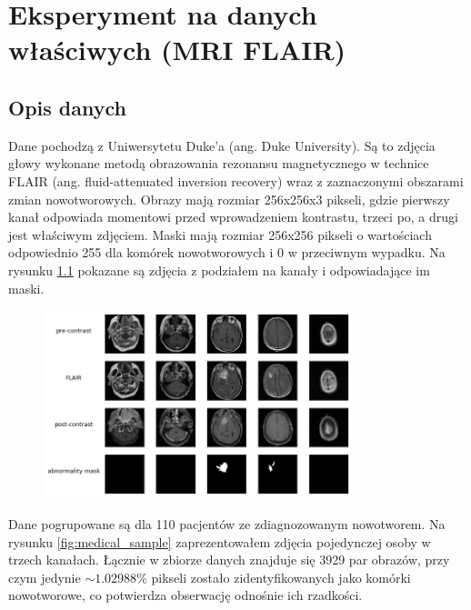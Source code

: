 \chapter{Eksperyment na danych właściwych (MRI FLAIR)}

\section{Opis danych}

Dane pochodzą z Uniwersytetu Duke'a (ang. Duke University). Są to zdjęcia głowy wykonane metodą obrazowania rezonansu magnetycznego w technice FLAIR (ang. fluid-attenuated inversion recovery) wraz z zaznaczonymi obszarami zmian nowotworowych. Obrazy mają rozmiar 256x256x3 pikseli, gdzie pierwszy kanał odpowiada momentowi przed wprowadzeniem kontrastu, trzeci po, a drugi jest właściwym zdjęciem. Maski mają rozmiar 256x256 pikseli o wartościach odpowiednio 255 dla komórek nowotworowych i 0 w przeciwnym wypadku. Na rysunku \ref{fig:medical_description} pokazane są zdjęcia z podziałem na kanały i odpowiadające im maski.

\begin{figure}[h!]
    \centering
    \includegraphics[width=0.8\textwidth]{images/medical_description}
    \caption{}
    \label{fig:medical_description}
\end{figure}

Dane pogrupowane są dla 110 pacjentów ze zdiagnozowanym nowotworem. Na rysunku \ref{fig:medical_sample} zaprezentowałem zdjęcia pojedynczej osoby w trzech kanałach. Łącznie w zbiorze danych znajduje się 3929 par obrazów, przy czym jedynie $\sim1.02988\%$ pikseli zostało zidentyfikowanych jako komórki nowotworowe, co potwierdza obserwację odnośnie ich rzadkości.

